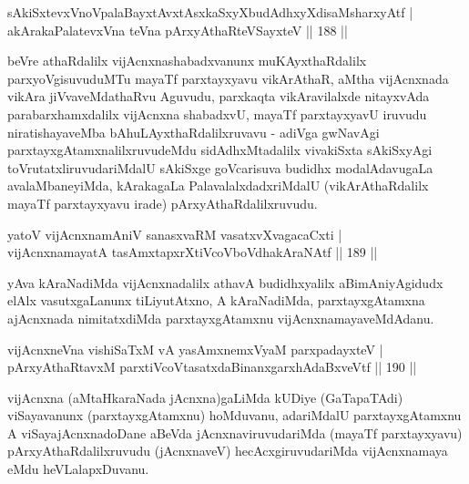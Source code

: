 \begin{shl}
sAkiSxtevxVnoVpalaBayxtAvxtAsxkaSxyXbudAdhxyXdisaMsharxyAtf |\\
akArakaPalatevxVna teVna pArxyAthaRteVSayxteV \hfill || 188 ||
\end{shl}


\begin{artha}
beVre athaRdalilx vijAcnxnashabadxvanunx muKAyxthaRdalilx parxyoVgisuvuduMTu \break mayaTf parxtayxyavu vikArAthaR, aMtha vijAcnxnada vikAra jiVvaveMdathaRvu Agu\-vudu, parxkaqta vikAravilalxde nitayxvAda parabarxhamxdalilx vijAcnxna shabadxvU, mayaTf \break parxtayxyavU iruvudu niratishayaveMba bAhuLAyxthaRdalilxruvavu - adiVga gwNa\-vAgi parxtayxgAtamxnalilxruvudeMdu sidAdhxMtadalilx vivakiSxta sAkiSxyAgi toVrutatxliruvu\-dariMdalU sAkiSxge goVcarisuva budidhx modalAdavugaLa avalaMbaneyiMda, kArakagaLa PalavalalxdadxriMdalU (vikArAthaRdalilx mayaTf parxtayxyavu irade) pArxyAthaRdalilxruvudu.
\end{artha}

\begin{shl}
yatoV vijAcnxnamAniV sanasxvaRM vasatxvXvagacaCxti |\\
vijAcnxnamayatA tasAmxtapxrXtiVcoV\s boVdhakAraNAtf \hfill || 189 ||
\end{shl}

\begin{artha}
yAva kAraNadiMda vijAcnxnadalilx athavA budidhxyalilx aBimAniyAgidudx elAlx vasutxgaLanunx tiLiyutAtxno, A kAraNadiMda, parxtayxgAtamxna ajAcnxnada nimitatxdiMda parxtayxgAtamxnu vijAcnxnamayaveMdAdanu.
\end{artha}


\begin{shl}
vijAcnxneVna vishiSaTxM vA yasAmxnemxVyaM parxpadayxteV |\\
pArxyAthaRtavxM parxtiVcoV\s tasatxdaBinanxgarxhAdaBxveVtf \hfill || 190 ||
\end{shl}

\begin{artha}
vijAcnxna (aMtaHkaraNada jAcnxna)gaLiMda kUDiye (GaTapaTAdi) viSayavanunx (parxtayxgAtamxnu) hoMduvanu, adariMdalU parxtayxgAtamxnu A viSayajAcnxnadoDane aBeVda jAcnxnaviruvudariMda (mayaTf parxtayxyavu) pArxyAthaRdalilxruvudu (jAcnxnaveV) hecAcxgiruvudariMda vijAcnxnamaya eMdu heVLalapxDuvanu.
\end{artha}

